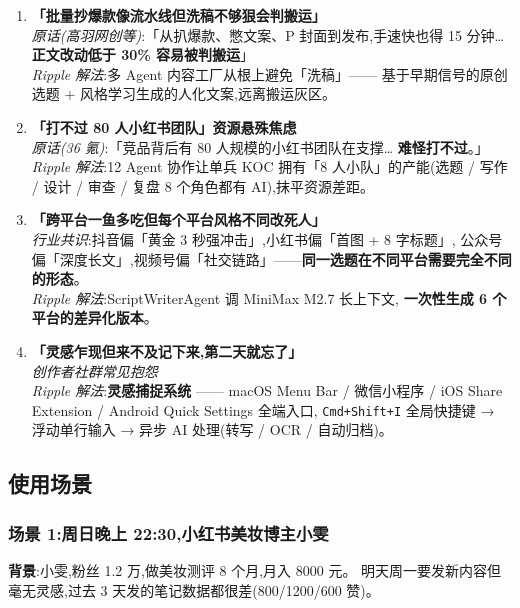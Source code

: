 \begin{enumerate}[leftmargin=*]
\item \textbf{「批量抄爆款像流水线但洗稿不够狠会判搬运」}\\
\textit{原话(高羽网创等)}:「从扒爆款、憋文案、P 封面到发布,手速快也得 15 分钟\dots
\textbf{正文改动低于 30\% 容易被判搬运}」\\
\textit{Ripple 解法}:多 Agent 内容工厂从根上避免「洗稿」——
基于早期信号的原创选题 + 风格学习生成的人化文案,远离搬运灰区。

\item \textbf{「打不过 80 人小红书团队」资源悬殊焦虑}\\
\textit{原话(36 氪)}:「竞品背后有 80 人规模的小红书团队在支撑\dots
\textbf{难怪打不过}。」\\
\textit{Ripple 解法}:12 Agent 协作让单兵 KOC 拥有「8 人小队」的产能(选题 / 写作 /
设计 / 审查 / 复盘 8 个角色都有 AI),抹平资源差距。

\item \textbf{「跨平台一鱼多吃但每个平台风格不同改死人」}\\
\textit{行业共识}:抖音偏「黄金 3 秒强冲击」,小红书偏「首图 + 8 字标题」,
公众号偏「深度长文」,视频号偏「社交链路」——\textbf{同一选题在不同平台需要完全不同的形态}。\\
\textit{Ripple 解法}:ScriptWriterAgent 调 MiniMax M2.7 长上下文,
\textbf{一次性生成 6 个平台的差异化版本}。

\item \textbf{「灵感乍现但来不及记下来,第二天就忘了」}\\
\textit{创作者社群常见抱怨}\\
\textit{Ripple 解法}:\textbf{灵感捕捉系统} ——
macOS Menu Bar / 微信小程序 / iOS Share Extension / Android Quick Settings 全端入口,
\texttt{Cmd+Shift+I} 全局快捷键 → 浮动单行输入 → 异步 AI 处理(转写 / OCR / 自动归档)。

\end{enumerate}


\subsection{使用场景}

\subsubsection{场景 1:周日晚上 22:30,小红书美妆博主小雯}

\textbf{背景}:小雯,粉丝 1.2 万,做美妆测评 8 个月,月入 8000 元。
明天周一要发新内容但毫无灵感,过去 3 天发的笔记数据都很差(800/1200/600 赞)。

